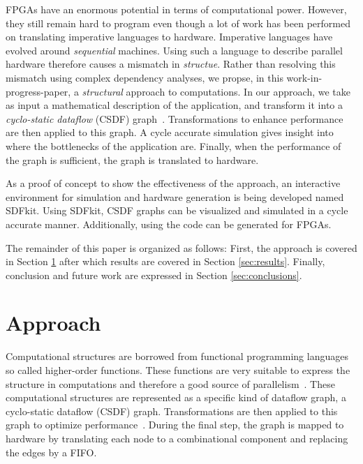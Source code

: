 \documentclass[journal]{IEEEtran}
\begin{document}
  FPGAs have an enormous potential in terms of computational power.
  However, they still remain hard to program even though a lot of work has been performed on translating imperative languages to hardware.
  Imperative languages have evolved around \emph{sequential} machines.
  Using such a language to describe parallel hardware therefore causes a mismatch in \emph{structue}.
  Rather than resolving this mismatch using complex dependency analyses, we propse, in this work-in-progress-paper, a \emph{structural} approach to computations.
  In our approach, we take as input a mathematical description of the application, and transform it into a \emph{cyclo-static dataflow} (CSDF) graph~\cite{bilsen1996}.
  Transformations to enhance performance are then applied to this graph.
  A cycle accurate simulation gives insight into where the bottlenecks of the application are.
  Finally, when the performance of the graph is sufficient, the graph is translated to hardware.

  As a proof of concept to show the effectiveness of the approach, an interactive environment for simulation and hardware generation  is being developed named SDFkit.
  Using SDFkit, CSDF graphs can be visualized and simulated in a cycle accurate manner.
  Additionally, using the code can be generated for FPGAs.

  The remainder of this paper is organized as follows:
  First, the approach is covered in Section \ref{sec:approach} after which results are covered in Section \ref{sec:results}.
  Finally, conclusion and future work are expressed in Section \ref{sec:conclusions}.


\section{Approach}
\label{sec:approach}

  Computational structures are borrowed from functional programming languages so called higher-order functions.
  These functions are very suitable to express the structure in computations and therefore a good source of parallelism~\cite{Wester15}.
  These computational structures are represented as a specific kind of dataflow graph, a cyclo-static dataflow (CSDF) graph.
  Transformations are then applied to this graph to optimize performance~\cite{deGroote16}.
  During the final step, the graph is mapped to hardware by translating each node to a combinational component and replacing the edges by a FIFO.
\end{document}
